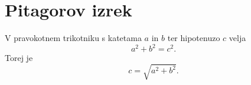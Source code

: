 \documentclass{article}
\begin{document}
\section*{Pitagorov izrek}
V pravokotnem trikotniku s katetama \(a\) in \(b\) ter hipotenuzo \(c\) velja
\[ a^2 + b^2 = c^2. \]
Torej je
\[ c = \sqrt{a^2 + b^2}. \]
\end{document}

